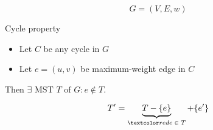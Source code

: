 \begin{frame}{}
  \centerline{}

  \[
    G = (V, E, w)
  \]
\end{frame}

\begin{frame}{}
  \begin{block}{Cycle property }
    \begin{itemize}
      \item Let $C$ be any cycle in $G$
      \item Let $e = (u,v)$ be  maximum-weight edge in $C$
    \end{itemize}
    Then $\exists \textrm{ MST } T \text{ of } G: e \notin T$.
  \end{block}


  \pause
  \vspace{-0.30cm}
  \[
    T' = \underbrace{T - \set{e}}_{\red{e \;\in\; T}} + \set{e'}
  \]
\end{frame}


